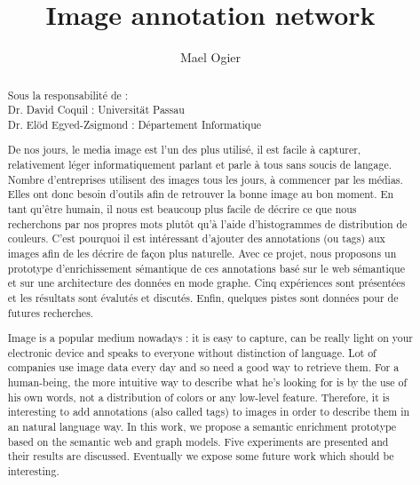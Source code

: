 \documentclass{llncs}
\title{Image annotation network}
\author{Mael Ogier}
\institute{Département Informatique\\INSA Lyon\\2014-2015}
\makeatletter
\let\oldappendix\appendix %
\renewcommand\appendix{%
    \oldappendix
    \newcommand{\section@cntformat}{\appendixname~\thesection\quad}
}
\makeatother
\begin{document}
\maketitle
\renewcommand{\abstractname}{} 
\begin{abstract}
Sous la responsabilité de :\\
Dr. David Coquil : Universität Passau\\
Dr. Elöd Egyed-Zsigmond : Département Informatique
\end{abstract}
% 
%
\renewcommand{\abstractname}{Résumé}  
\begin{abstract}
De nos jours, le media image est l'un des plus utilisé, il est facile à capturer, relativement léger informatiquement parlant et parle à tous sans soucis de langage. Nombre d'entreprises utilisent des images tous les jours, à commencer par les médias. Elles ont donc besoin d'outils afin de retrouver la bonne image au bon moment. En tant qu'être humain, il nous est beaucoup plus facile de décrire ce que nous recherchons par nos propres mots plutôt qu'à l'aide d'histogrammes de distribution de couleurs. C'est pourquoi il est intéressant d'ajouter des annotations (ou tags) aux images afin de les décrire de façon plus naturelle. Avec ce projet, nous proposons un prototype d'enrichissement sémantique de ces annotations basé sur le web sémantique et sur une architecture des données en mode graphe. Cinq expériences sont présentées et les résultats sont évalutés et discutés. Enfin, quelques pistes sont données pour de futures recherches. 
\end{abstract}

\renewcommand{\abstractname}{Abstract}  
\begin{abstract}
Image is a popular medium nowadays : it is easy to capture, can be really light on your electronic device and speaks to everyone without distinction of language. Lot of companies use image data every day and so need a good way to retrieve them. For a human-being, the more intuitive way to describe what he's looking for is by the use of his own words, not a distribution of colors or any low-level feature. Therefore, it is interesting to add annotations (also called tags) to images in order to describe them in an natural language way. In this work, we propose a semantic enrichment prototype based on the semantic web and graph models. Five experiments are presented and their results are discussed. Eventually we expose some future work which should be interesting.
\end{abstract}





\appendix

\end{document}
